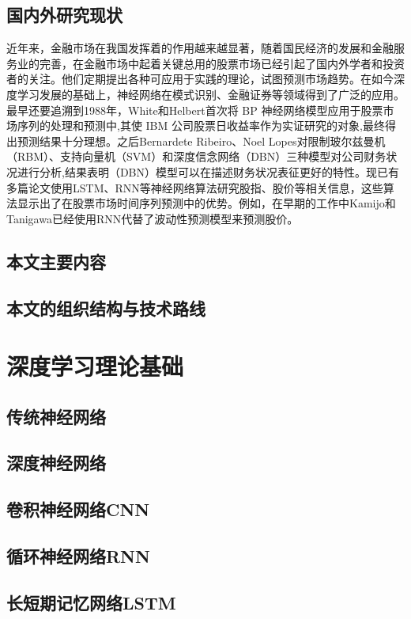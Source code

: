 \documentclass[UTF8]{ctexart}
\begin{document}
\subsection{国内外研究现状}
近年来，金融市场在我国发挥着的作用越来越显著，随着国民经济的发展和金融服务业的完善，在金融市场中起着关键总用的股票市场已经引起了国内外学者和投资者的关注。他们定期提出各种可应用于实践的理论，试图预测市场趋势\cite{Lahmiri2015,Chiang2015,Seddon2017,Zhou2016,Ichinose2018}。在如今深度学习发展的基础上\cite{Gers2002,Hinton2006,Jiang2018,Kim2015,Kuremoto2014,Torres2017}，神经网络在模式识别、金融证券等领域得到了广泛的应用。最早还要追溯到1988年，White和Helbert首次将 BP 神经网络模型应用于股票市场序列的处理和预测中,其使 IBM 公司股票日收益率作为实证研究的对象,最终得出预测结果十分理想\cite{White1988}。之后Bernardete Ribeiro、Noel Lopes对限制玻尔兹曼机（RBM）、支持向量机（SVM）和深度信念网络（DBN）三种模型对公司财务状况进行分析,结果表明（DBN）模型可以在描述财务状况表征更好的特性\cite{Ribeiro2011}。现已有多篇论文使用LSTM、RNN等神经网络算法研究股指、股价等相关信息\cite{Pang2018,Chong2017,Bao2017,Chen2015,Fischer2018,Hsieh2011,Huynh2017,Liu2017}，这些算法显示出了在股票市场时间序列预测中的优势。例如，在早期的工作中Kamijo和Tanigawa已经使用RNN代替了波动性预测模型来预测股价\cite{Kamijo1990}。
\subsection{本文主要内容}
\subsection{本文的组织结构与技术路线}
\section{深度学习理论基础}
\subsection{传统神经网络}
\subsection{深度神经网络}
\subsection{卷积神经网络CNN}
\subsection{循环神经网络RNN}
\subsection{长短期记忆网络LSTM}
\end{document}
